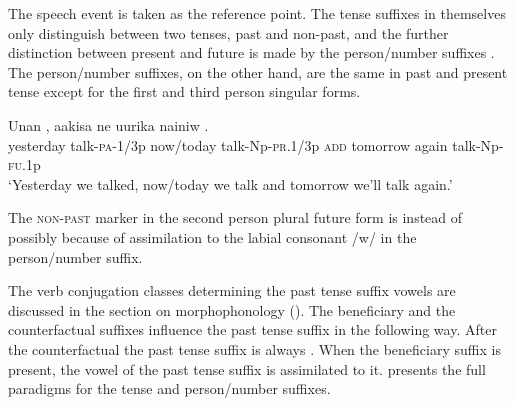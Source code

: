 The speech event is taken as the reference point. The tense suffixes in themselves only distinguish between two tenses, past and non-past, and the further distinction between present and future is made by the person/number suffixes . The person/number suffixes, on the other hand, are the same in past and present tense except for the first and third person singular forms. 

\ea%
\label{ex:3:x1029}
\gll Unan , aakisa  ne uurika nainiw .\\
yesterday talk-\textsc{pa}-1/3p now/today talk-Np-\textsc{pr}.1/3p \textsc{add} tomorrow again talk-Np-\textsc{fu}.1p\\
\glt`Yesterday we talked, now/today we talk and tomorrow we'll talk again.'
\z

The \textsc{ non-past} marker in the second person plural future form is \textstyleEmphasizedVernacularWords{\nobreakdash-} instead of \textstyleEmphasizedVernacularWords{\nobreakdash-} possibly because of assimilation to the labial consonant /w/ in the person/number suffix. 

The verb conjugation classes determining the past tense suffix vowels are discussed in the section on morphophonology (). The beneficiary and the counterfactual suffixes influence the past tense suffix in the following way. After the counterfactual the past tense suffix is always \textstyleEmphasizedVernacularWords{\nobreakdash-}. When the beneficiary suffix is present, the vowel of the past tense suffix is assimilated to it.  presents the full paradigms for the tense and person/number suffixes.


\begin{table}
\caption{Tense and person/number suffixes}
\label{tab:3:tenseperson}


\end{table}

